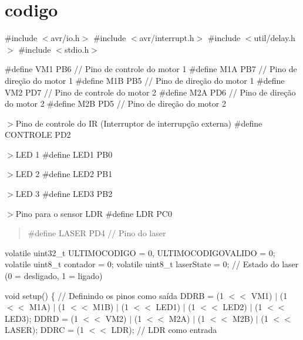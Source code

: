 \chapter{codigo}
\hypertarget{md__src_2codigo}{}\label{md__src_2codigo}
\#include \texorpdfstring{$<$}{<}avr/io.\+h\texorpdfstring{$>$}{>} \#include \texorpdfstring{$<$}{<}avr/interrupt.\+h\texorpdfstring{$>$}{>} \#include \texorpdfstring{$<$}{<}util/delay.\+h\texorpdfstring{$>$}{>} \#include \texorpdfstring{$<$}{<}stdio.\+h\texorpdfstring{$>$}{>}

\#define VM1 PB6 // Pino de controle do motor 1 \#define M1A PB7 // Pino de direção do motor 1 \#define M1B PB5 // Pino de direção do motor 1 \#define VM2 PD7 // Pino de controle do motor 2 \#define M2A PD6 // Pino de direção do motor 2 \#define M2B PD5 // Pino de direção do motor 2

\texorpdfstring{$>$}{>}Pino de controle do IR (Interruptor de interrupção externa) \#define CONTROLE PD2

\texorpdfstring{$>$}{>}LED 1 \#define LED1 PB0

\texorpdfstring{$>$}{>}LED 2 \#define LED2 PB1

\texorpdfstring{$>$}{>}LED 3 \#define LED3 PB2

\texorpdfstring{$>$}{>}Pino para o sensor LDR \#define LDR PC0

\begin{quote}
 \#define LASER PD4 // Pino do laser \end{quote}
volatile uint32\+\_\+t ULTIMOCODIGO = 0, ULTIMOCODIGOVALIDO = 0; volatile uint8\+\_\+t contador = 0; volatile uint8\+\_\+t laser\+State = 0; // Estado do laser (0 = desligado, 1 = ligado)

void setup() \{ // Definindo os pinos como saída DDRB = (1 \texorpdfstring{$<$}{<}\texorpdfstring{$<$}{<} VM1) \texorpdfstring{$\vert$}{|} (1 \texorpdfstring{$<$}{<}\texorpdfstring{$<$}{<} M1A) \texorpdfstring{$\vert$}{|} (1 \texorpdfstring{$<$}{<}\texorpdfstring{$<$}{<} M1B) \texorpdfstring{$\vert$}{|} (1 \texorpdfstring{$<$}{<}\texorpdfstring{$<$}{<} LED1) \texorpdfstring{$\vert$}{|} (1 \texorpdfstring{$<$}{<}\texorpdfstring{$<$}{<} LED2) \texorpdfstring{$\vert$}{|} (1 \texorpdfstring{$<$}{<}\texorpdfstring{$<$}{<} LED3); DDRD = (1 \texorpdfstring{$<$}{<}\texorpdfstring{$<$}{<} VM2) \texorpdfstring{$\vert$}{|} (1 \texorpdfstring{$<$}{<}\texorpdfstring{$<$}{<} M2A) \texorpdfstring{$\vert$}{|} (1 \texorpdfstring{$<$}{<}\texorpdfstring{$<$}{<} M2B) \texorpdfstring{$\vert$}{|} (1 \texorpdfstring{$<$}{<}\texorpdfstring{$<$}{<} LASER); DDRC = (1 \texorpdfstring{$<$}{<}\texorpdfstring{$<$}{<} LDR); // LDR como entrada


